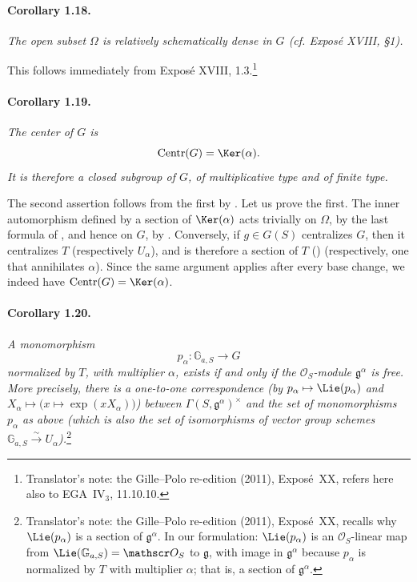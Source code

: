 \paragraph{\textbf{Corollary 1.18.}}
\emph{The open subset \(\Omega\) is relatively schematically dense
in \(G\) \textup{(cf. Exposé XVIII, \S1)}.}

This follows immediately from Exposé XVIII, 1.3.\footnote{Translator's note: the Gille--Polo re-edition (2011), Exposé~XX, refers here also to
EGA~IV\(_3\), 11.10.10.}

\paragraph{\textbf{Corollary 1.19.}}
\emph{The center of \(G\) is}
\[
  \operatorname{Centr}(G)=\Ker(\alpha).
\]
\emph{It is therefore a closed subgroup of \(G\), of
multiplicative type and of finite type.}

The second assertion follows from the first by . Let
us prove the first. The inner automorphism defined by a section of
\(\Ker(\alpha)\) acts trivially on \(\Omega\), by the last formula
of , and hence on \(G\), by . Conversely, if
\(g\in G(S)\) centralizes \(G\), then it centralizes \(T\)
(respectively \(U_\alpha\)), and is therefore a section of \(T\)
() (respectively, one that annihilates
\(\alpha\)). Since the same argument applies
after every base change, we indeed have
\(\operatorname{Centr}(G)=\Ker(\alpha)\).

\paragraph{\textbf{Corollary 1.20.}}
\emph{A monomorphism
\[
  p_\alpha\colon\mathbb G_{a,S}\longrightarrow G
\]
normalized by \(T\), with multiplier \(\alpha\), exists if and
only if the \(\mathscr O_S\)-module \(\mathfrak g^\alpha\) is
free. More precisely, there is a one-to-one correspondence
\textup{(}by \(p_\alpha\mapsto\Lie(p_\alpha)\) and
\(X_\alpha\mapsto\bigl(x\mapsto\exp(xX_\alpha)\bigr)\)\textup{)}
between \(\Gamma(S,\mathfrak g^\alpha)^\times\) and the set of
monomorphisms \(p_\alpha\) as above \textup{(}which is also the set of
isomorphisms of vector group schemes
\(\mathbb G_{a,S}\xrightarrow{\sim}U_\alpha\)\textup{)}.}\footnote{Translator's note: the Gille--Polo re-edition (2011), Exposé~XX, recalls
why \(\Lie(p_\alpha)\) is a section of \(\mathfrak g^\alpha\). In our formulation:
\(\Lie(p_\alpha)\) is an \(\mathscr O_S\)-linear map from \(\Lie(\mathbb G_{a,S})=\mathscr O_S\) to
\(\mathfrak g\), with image in \(\mathfrak g^\alpha\) because \(p_\alpha\) is normalized by \(T\)
with multiplier \(\alpha\); that is, a section of \(\mathfrak g^\alpha\).}

